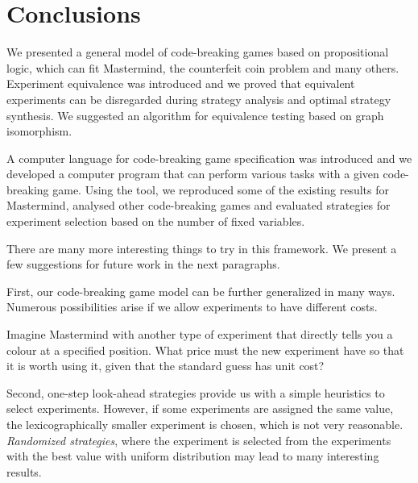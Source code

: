 \chapter{Conclusions}

We presented a general model of code-breaking games based on propositional logic,
  which can fit Mastermind, the counterfeit coin problem and many others.
Experiment equivalence was introduced and we proved that
  equivalent experiments can be disregarded during strategy analysis and
  optimal strategy synthesis.
We suggested an algorithm for equivalence
  testing based on graph isomorphism.

A computer language for code-breaking game specification was introduced
  and we developed a computer program that can perform various tasks
  with a given code-breaking game.
Using the tool, we reproduced some of the existing results for Mastermind,
  analysed other code-breaking games and
  evaluated strategies for experiment selection
  based on the number of fixed variables.

There are many more interesting things to try in this framework.
We present a few suggestions for future work in the next paragraphs.

First, our code-breaking game model can be further generalized in many ways.
Numerous possibilities arise if we allow experiments to have different costs.

Imagine Mastermind with another type of experiment
  that directly tells you a colour at a specified position.
What price must the new experiment have so that
  it is worth using it, given that the standard guess has unit cost?


Second, one-step look-ahead strategies provide us with
  a simple heuristics to select experiments.
However, if some experiments are assigned the same value, the
  lexicographically smaller experiment is chosen,
  which is not very reasonable.
\emph{Randomized strategies},
  where the experiment is selected from the experiments
  with the best value with uniform distribution
  may lead to many interesting results.

